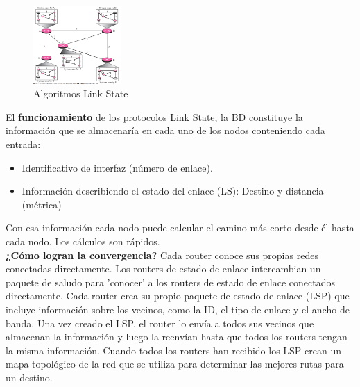 \documentclass[10pt,portrait, twocolumn]{article}
\begin{document}
\begin{figure}[h]
	\centering
     \includegraphics[width=0.3\textwidth]{IGP}
      \caption{Algoritmos Link State}
      \label{fig:Regiones de frecuencias}
  \end{figure}

El \textbf{funcionamiento} de los protocolos Link State, la BD constituye la información que se almacenaría en cada uno de los nodos conteniendo cada entrada:
	
	\begin{itemize}
		\item Identificativo de interfaz (número de enlace).
		\item Información describiendo el estado del enlace (LS): Destino y distancia (métrica)
	\end{itemize}
	
Con esa información cada nodo puede calcular el camino más corto desde él hasta cada nodo. Los cálculos son rápidos.\\

\textbf{¿Cómo logran  la convergencia?} Cada router conoce sus propias redes conectadas directamente. Los routers de estado de enlace intercambian un paquete de saludo para 'conocer' a los routers de estado de enlace conectados directamente. Cada router crea su propio paquete de estado de enlace (LSP) que incluye información sobre los vecinos, como la ID, el tipo de enlace y el ancho de banda. Una vez creado el LSP, el router lo envía a todos sus vecinos que almacenan la información y luego la reenvían hasta que todos los routers tengan la misma información. Cuando todos los routers han recibido los LSP crean un mapa topológico de la red que se utiliza para determinar las mejores rutas para un destino.\\
\end{document}
